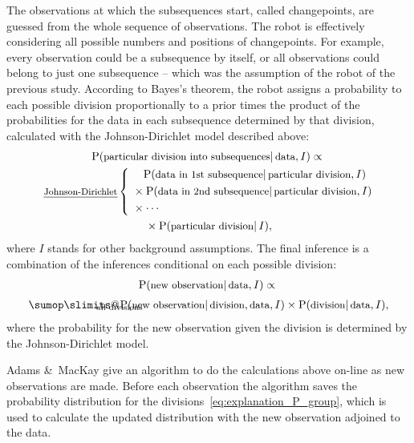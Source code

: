\documentclass[\ifafour a4paper,12pt,\else a5paper,10pt,\fi%
onecolumn,oneside,article,%
british%
]{memoir}
\makeatletter
\theoremstyle{remark}
\theoremstyle{innote}
\def\sum{\DOTSI\sumop\slimits@}
\newcommand*{\citey}{\parencites*}
\newcommand*{\amp}{\&}
\newcommand*{\p}{\mathrm{P}}%
\renewcommand*{\|}{\mathpunct{|}}
\newcommand*{\ptext}[1]{\text{\small #1}}
\newcommand*{\yI}{I}
\makeatother
\begin{document}
The observations at which the subsequences start, called changepoints, are
guessed from the whole sequence of observations. The robot is effectively
considering all possible numbers and positions of changepoints. For
example, every observation could be a subsequence by itself, or all
observations could belong to just one subsequence -- which was the
assumption of the robot of the previous study. According to Bayes's
theorem, the robot assigns a probability to each possible division
proportionally to a prior times the product of the probabilities for the
data in each subsequence determined by that division, calculated with the
Johnson-Dirichlet model described above:
\begin{multline}
  \label{eq:explanation_P_group}
  \p(\ptext{particular division into subsequences} \| \ptext{data}, \yI)
  \propto{}\\
  \text{\footnotesize\emph{Johnson-Dirichlet}}\left\{\;
    \!\begin{aligned}
        &\quad\p(\ptext{data in 1st subsequence} \| \ptext{particular division}, \yI)
          \\
        &{}\times\p(\ptext{data in 2nd subsequence} \| \ptext{particular division}, \yI)
          \\
              &{}\times\dotsm
  \end{aligned}\right.\\
 {}\times \p(\ptext{particular division} \| \yI),
\end{multline}
where $\yI$ stands for other background assumptions. The final inference is
a combination of the inferences conditional on each possible division:
\begin{multline}
  \label{eq:explanation_group_mixed}
  \p(\ptext{new observation} \| \ptext{data}, \yI) \propto{}\\[\jot]
  \sum_{\mathclap{\text{all divisions}}}
  \p(\ptext{new observation} \| \ptext{division}, \ptext{data}, \yI)
\times  \p(\ptext{division} \| \ptext{data}, \yI),
\end{multline}
where the probability for the new observation given the division is
determined by the Johnson-Dirichlet model.

Adams \amp\ MacKay \citey{adamsetal2007} give an algorithm to do the
calculations above on-line as new observations are made. Before each
observation the algorithm saves the probability distribution for the
divisions~\eqref{eq:explanation_P_group}, which is used to calculate the
updated distribution with the new observation adjoined to the data.
\end{document}
